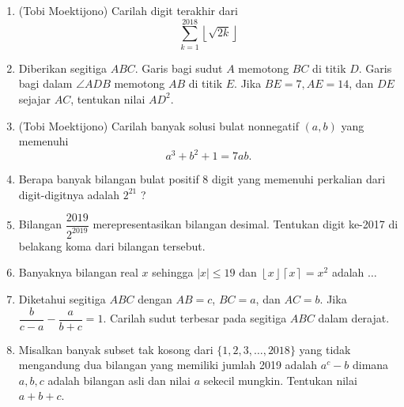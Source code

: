 \documentclass[12pt]{scrartcl}
\begin{document}
\begin{enumerate}
	\item (Tobi Moektijono)
	Carilah digit terakhir dari $$\sum_{k=1}^{2018} \left \lfloor \sqrt{2k} \right \rfloor $$
	
	\item Diberikan segitiga $ABC$. Garis bagi sudut $A$ memotong $BC$ di titik $D$. Garis bagi
	dalam $\angle ADB$ memotong $AB$ di titik $E$. Jika $BE = 7, AE = 14$, dan $DE$ sejajar $AC$,
	tentukan nilai $AD^2$.
	
	\item (Tobi Moektijono)
	Carilah banyak solusi bulat nonnegatif $(a,b)$ yang memenuhi $$a^3+b^2+1=7ab.$$
	
	\item
	Berapa banyak bilangan bulat positif 8 digit yang memenuhi perkalian dari digit-digitnya adalah $2^{21}$
	?
	
	\item Bilangan $\dfrac{2019}{2^{2019}}$ merepresentasikan bilangan desimal. Tentukan digit ke-2017 di belakang koma dari bilangan tersebut.
	
	\item Banyaknya bilangan real $x$ sehingga $|x| \le 19$ dan $\left \lfloor x \right \rfloor\left \lceil x \right \rceil = x^2$ adalah $\dots$
	
	\item Diketahui segitiga $ABC$ dengan $AB=c$, $BC=a$, dan $AC=b$. Jika $\dfrac{b}{c-a} - \dfrac{a}{b+c} = 1$. Carilah sudut terbesar pada segitiga $ABC$ dalam derajat.
	
	\item
	Misalkan banyak subset tak kosong dari $\{1,2,3,\dots,2018\}$ yang tidak mengandung dua bilangan yang memiliki jumlah 2019 adalah $a^c-b$ dimana $a,b,c$ adalah bilangan asli dan nilai $a$ sekecil mungkin. Tentukan nilai $a+b+c$.
\end{enumerate}
\end{document}
